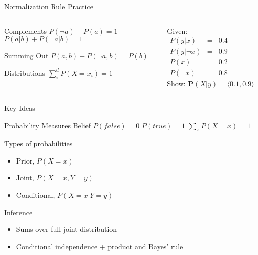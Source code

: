 \documentclass[14pt]{beamer}
\begin{document}
\begin{frame}{Normalization Rule Practice}
	\begin{columns}
		\begin{column}{0.47\textwidth}
			\begin{block}{Complements}
				$P(\lnot a) + P(a) = 1$ \\
				$P(a|b) + P(\lnot a|b) = 1$
			\end{block}
			\begin{block}{Summing Out}
				$P(a, b) + P(\lnot a, b) = P(b)$
			\end{block}
			\begin{block}{Distributions}
				$\sum\limits^{d}_{i}{P(X=x_{i})} = 1$
			\end{block}
		\end{column}
		\begin{column}{0.51\textwidth}
			\small
			Given:
			\\ \smallskip
			$
			\begin{array}{lll}
				P(y|x)       & = & 0.4 \\
				P(y|\lnot x) & = & 0.9 \\
				P(x)         & = & 0.2 \\
				P(\lnot x)   & = & 0.8
			\end{array}
			$
			\\ \bigskip
			Show: $\mathbf{P}(X|y) = \langle 0.1, 0.9 \rangle$
		\end{column}
	\end{columns}
\end{frame}
\begin{frame}{Key Ideas}
	\begin{block}{Probability Measures Belief}
		$P(\textit{false}) = 0$ \tab $P(\textit{true}) = 1$ \tab $\sum\limits_{x}P(X=x) = 1$
	\end{block}
	\begin{block}{Types of probabilities}
		\begin{itemize}
			\item Prior, $P(X=x)$
			\item Joint, $P(X=x,Y=y)$
			\item Conditional, $P(X=x|Y=y)$
		\end{itemize}
	\end{block}
	\begin{block}{Inference}
		\begin{itemize}
			\item Sums over full joint distribution
			\item Conditional independence + product and Bayes' rule
		\end{itemize}
	\end{block}
\end{frame}
\end{document}

